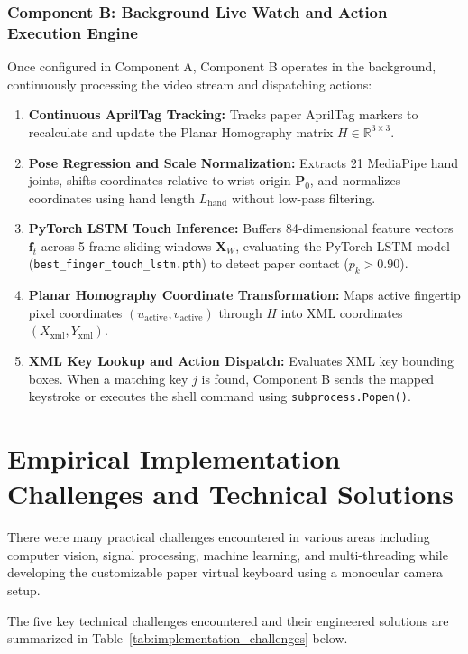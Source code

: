 \subsubsection{Component B: Background Live Watch and Action Execution Engine}
Once configured in Component A, Component B operates in the background, continuously processing the video stream and dispatching actions:
\begin{enumerate}
    \item \textbf{Continuous AprilTag Tracking:} Tracks paper AprilTag markers to recalculate and update the Planar Homography matrix $H \in \mathbb{R}^{3 \times 3}$.
    \item \textbf{Pose Regression and Scale Normalization:} Extracts 21 MediaPipe hand joints, shifts coordinates relative to wrist origin $\mathbf{P}_0$, and normalizes coordinates using hand length $L_{\text{hand}}$ without low-pass filtering.
    \item \textbf{PyTorch LSTM Touch Inference:} Buffers 84-dimensional feature vectors $\mathbf{f}_t$ across 5-frame sliding windows $\mathbf{X}_W$, evaluating the PyTorch LSTM model (\texttt{best\_finger\_touch\_lstm.pth}) to detect paper contact ($p_k > 0.90$).
    \item \textbf{Planar Homography Coordinate Transformation:} Maps active fingertip pixel coordinates $(u_{\text{active}}, v_{\text{active}})$ through $H$ into XML coordinates $(X_{\text{xml}}, Y_{\text{xml}})$.
    \item \textbf{XML Key Lookup and Action Dispatch:} Evaluates XML key bounding boxes. When a matching key $j$ is found, Component B sends the mapped keystroke or executes the shell command using \texttt{subprocess.Popen()}.
\end{enumerate}

\section{Empirical Implementation Challenges and Technical Solutions}
\label{sec:imp_challenges}
There were many practical challenges encountered in various areas including computer vision, signal processing, machine learning, and multi-threading while developing the customizable paper virtual keyboard using a monocular camera setup.

The five key technical challenges encountered and their engineered solutions are summarized in Table~\ref{tab:implementation_challenges} below.

